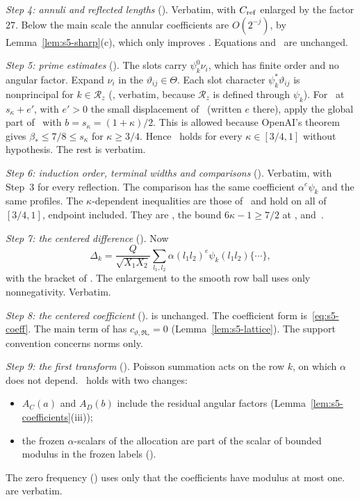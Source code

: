\documentclass[11pt]{article}
\numberwithin{equation}{section}
\begin{document}
\emph{Step 4: annuli and reflected lengths} (\cite[Section~18.1]{OAI78}). Verbatim, with $C_{\rm ref}$ enlarged by the
factor $27$. Below the main scale the annular coefficients are $O(2^{-j})$, by
Lemma~\ref{lem:s5-sharp}(c), which only improves \cite[Section~18.1]{OAI78}. Equations
\cite[(18.9)]{OAI78} and~\cite[(18.10)]{OAI78} are unchanged.

\emph{Step 5: prime estimates} (\cite[Section~18.2]{OAI78}). The slots carry $\psi_k^0\nu_i$, which has finite order and
no angular factor. Expand $\nu_i$ in the $\vartheta_{ij}\in\Theta$. Each slot character $\psi_k^*\vartheta_{ij}$
is nonprincipal for $k\in\mathcal R_z$ (\cite[Section~18.2]{OAI78}, verbatim, because $\mathcal R_z$ is defined
through $\psi_k$). For~\cite[eq.~(18.11)]{OAI78} at $s_\kappa+e'$, with $e'>0$ the small displacement
of~\cite{OAI78} (written $e$ there), apply the global part
of~\cite[Lemma~4.9]{OAI78} with $b=s_\kappa=(1+\kappa)/2$. This is
allowed because OpenAI's theorem~\cite[Theorem~1.1]{OAI78} gives $\beta_*\le7/8\le s_\kappa$ for
$\kappa\ge3/4$. Hence~\cite[eq.~(18.12)]{OAI78} holds for every $\kappa\in[3/4,1]$ without hypothesis.
The rest is verbatim.

\emph{Step 6: induction order, terminal widths and comparisons} (\cite[Section~18.2]{OAI78}). Verbatim, with Step~3
for every reflection. The comparison has the same coefficient $\alpha^e\psi_k$ and the same profiles. The
$\kappa$-dependent inequalities are those of~\cite{OAI78} and hold on all of $[3/4,1]$, endpoint
included. They are \cite[eq.~(18.13)]{OAI78}, the bound $6\kappa-1\ge7/2$ at \cite[Section~18.2]{OAI78},
\cite[eq.~(18.15)]{OAI78} and~\cite[eq.~(18.16)]{OAI78}.

\emph{Step 7: the centered difference} (\cite[Section~18.2]{OAI78}). Now
\begin{equation}\label{eq:d189}
 \Delta_k=\frac Q{\sqrt{X_1X_2}}\sum_{l_1,l_2}\alpha(l_1l_2)^e\psi_k(l_1l_2)\{\cdots\},
\end{equation}
with the bracket of \cite[Section~18.2]{OAI78}. The enlargement to the smooth row ball uses only nonnegativity.
Verbatim.

\emph{Step 8: the centered coefficient} (\cite[Section~18.3]{OAI78}). \cite[eq.~(18.17)]{OAI78} is unchanged. The
coefficient form is~\eqref{eq:s5-coeff}. The main term of \cite[Section~18.3]{OAI78} has
$c_{\vartheta,\mathfrak R_*}=0$ (Lemma~\ref{lem:s5-lattice}). The support convention concerns norms only.

\emph{Step 9: the first transform} (\cite[Section~18.4]{OAI78}). Poisson summation acts on the row $k$, on which $\alpha$
does not depend.~\cite[eq.~(18.21)]{OAI78} holds with two changes:
\begin{itemize}
\item $A_C(a)$ and $A_D(b)$ include the residual angular factors (Lemma~\ref{lem:s5-coefficients}(iii));
\item the frozen $\alpha$-scalars of the allocation are part of the scalar of bounded modulus in the frozen
 labels (\cite[Section~18.4]{OAI78}).
\end{itemize}
The zero frequency (\cite[Section~18.4]{OAI78}) uses only that the coefficients have modulus at most one.
\cite[eqs.~(18.23), (18.24)]{OAI78} are verbatim.
\end{document}
